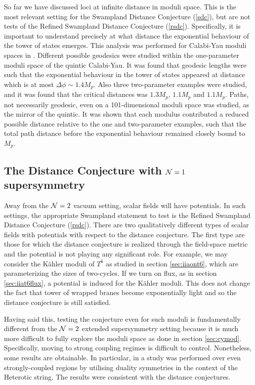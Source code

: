 \documentclass[11pt,a4paper]{article}
\numberwithin{equation}{section}
\numberwithin{table}{section}\setlength{\multlinegap}{25pt}
\begin{document}
{So far we have discussed loci at infinite distance in moduli space. This is the most relevant setting for the Swampland Distance Conjecture (\ref{sdc}), but are not tests of the Refined Swampland Distance Conjecture (\ref{rsdc}). Specifically, it is important to understand precisely at what distance the exponential behaviour of the tower of states emerges. This analysis was performed for Calabi-Yau moduli spaces in \cite{Blumenhagen:2018nts}. Different possible geodesics were studied within the one-parameter moduli space of the quintic Calabi-Yau. It was found that geodesic lengths were such that the exponential behaviour in the tower of states appeared at distance which is at most $\Delta \phi \sim 1.4 M_p$. Also three two-parameter examples were studied, and it was found that the critical distances was $1.3 M_p$, $1.1 M_p$ and $1.1 M_p$.  Paths, not necessarily geodesic, even on a 101-dimensional moduli space was studied, as the mirror of the quintic. It was shown that each modulus contributed a reduced possible distance relative to the one and two-parameter examples, such that the total path distance before the exponential behaviour remained closely bound to $M_p$.  

\subsection{The Distance Conjecture with ${\cal N}=1$ supersymmetry}
\label{sec:dcaxmon}

Away from the ${\cal N}=2$ vacuum setting, scalar fields will have potentials. In such settings, the appropriate Swampland statement to test is the Refined Swampland Distance Conjecture (\ref{rsdc}). There are two qualitatively different types of scalar fields with potentials with respect to the distance conjecture. The first type are those for which the distance conjecture is realized through the field-space metric and the potential is not playing any significant role. For example, we may consider the K{\"a}hler moduli of $T^6$ as studied in section \ref{sec:iiaont6}, which are parameterizing the sizes of two-cycles. If we turn on flux, as in section \ref{sec:iiat6flux}, a potential is induced for the K{\"a}hler moduli. This does not change the fact that tower of wrapped branes become exponentially light and so the distance conjecture is still satisfied. 

Having said this, testing the conjecture even for such moduli is fundamentally different from the ${\cal N}=2$ extended supersymmetry setting because it is much more difficult to fully explore the moduli space as done in section \ref{sec:cymod}. Specifically, moving to strong coupling regimes is difficult to control. Nonetheless, some results are obtainable. In particular, in \cite{Gonzalo:2018guu} a study was performed over even strongly-coupled regions by utilising duality symmetries in the context of the Heterotic string. The results were consistent with the distance conjectures. 

}
\end{document}
